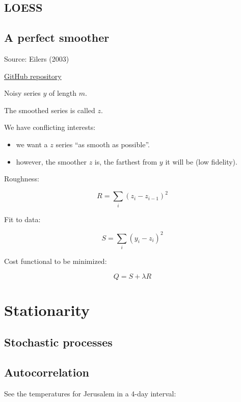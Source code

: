 \documentclass[
  letterpaper,
  DIV=11,
  numbers=noendperiod,
  oneside]{scrreprt}
\providecommand{\tightlist}{%
  \setlength{\itemsep}{0pt}\setlength{\parskip}{0pt}}\usepackage{longtable,booktabs,array}
\begin{document}
\hypertarget{loess}{%
\chapter{LOESS}\label{loess}}

\hypertarget{a-perfect-smoother}{%
\chapter{A perfect smoother}\label{a-perfect-smoother}}

Source: Eilers (2003)

\href{https://github.com/mhvwerts/whittaker-eilers-smoother/tree/master}{GitHub
repository}

Noisy series \(y\) of length \(m\).

The smoothed series is called \(z\).

We have conflicting interests:

\begin{itemize}
\tightlist
\item
  we want a \(z\) series ``as smooth as possible''.
\item
  however, the smoother \(z\) is, the farthest from \(y\) it will be
  (low fidelity).
\end{itemize}

Roughness:

\[
R = \displaystyle\sum_i (z_i - z_{i-1})^2
\]

Fit to data:

\[
S = \displaystyle\sum_i (y_i - z_i)^2
\]

Cost functional to be minimized:

\[
Q = S + \lambda R
\]

\part{Stationarity}

\hypertarget{stochastic-processes}{%
\chapter{Stochastic processes}\label{stochastic-processes}}

\hypertarget{autocorrelation}{%
\chapter{Autocorrelation}\label{autocorrelation}}

See the temperatures for Jerusalem in a 4-day interval:
\end{document}
